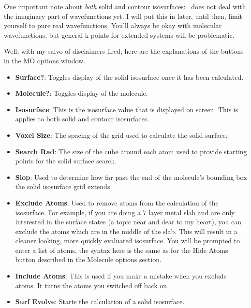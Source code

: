 One important note about {\em both} solid and contour isosurfaces: 
\viewprog\ does not deal with the imaginary part of 
wavefunctions yet.  I will put this in later, until then, limit
yourself to pure real wavefunctions.  You'll always be okay with
molecular wavefunctions, but general k points for extended systems
will be problematic.

Well, with my salvo of disclaimers fired, here are the explanations of
the buttons in the MO options window.

\begin{itemize}

\item {\bf Surface?}: Toggles display of the solid isosurface once it has
been calculated.

\item {\bf Molecule?}: Toggles display of the molecule.

\item {\bf Isosurface}: This is the isosurface value that is displayed
on screen.  This is applies to both solid and contour isosurfaces.

\item {\bf Voxel Size}: The spacing of the grid used to calculate the
solid surface.

\item {\bf Search Rad}: The size of the cube around each atom used to
provide starting points for the solid surface search.

\item {\bf Slop}:  Used to determine how far past the end of the
molecule's bounding box the solid isosurface grid extends.

\item {\bf Exclude Atoms}:  Used to remove atoms from the calculation
of the isosurface.  For example, if you are doing a 7 layer metal slab
and are only interested in the surface states (a topic near and dear
to my heart), you can exclude the atoms which are in the middle of the
slab.  This will result in a cleaner looking, more quickly evaluated
isosurface.  You will be prompted to enter a list of atoms, the syntax
here is the same as for the Hide Atoms button described in the
Molecule options section.

\item {\bf Include Atoms}:  This is used if you make a mistake when
you exclude atoms. It turns the atoms you switched off back on.

\item {\bf Surf Evolve}: Starts the calculation of a solid isosurface.


\end{itemize}

